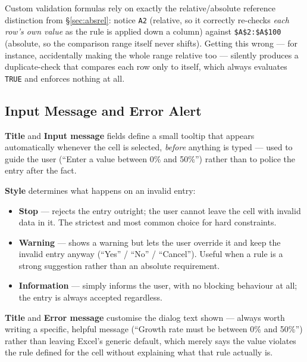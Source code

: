 \documentclass[11pt,a4paper]{article}
\begin{document}
\begin{keyconcept}
Custom validation formulas rely on exactly the relative/absolute reference distinction from \S\ref{sec:absrel}: notice \texttt{A2} (relative, so it correctly re-checks \emph{each row's own value} as the rule is applied down a column) against \texttt{\$A\$2:\$A\$100} (absolute, so the comparison range itself never shifts). Getting this wrong --- for instance, accidentally making the whole range relative too --- silently produces a duplicate-check that compares each row only to itself, which always evaluates \texttt{TRUE} and enforces nothing at all.
\end{keyconcept}

\subsection{Input Message and Error Alert}

\begin{formulasyntax}
\textbf{Title} and \textbf{Input message} fields define a small tooltip that appears automatically whenever the cell is selected, \emph{before} anything is typed --- used to guide the user (``Enter a value between 0\% and 50\%'') rather than to police the entry after the fact.
\end{formulasyntax}

\begin{formulasyntax}
\textbf{Style} determines what happens on an invalid entry:
\begin{itemize}
  \item \textbf{Stop} --- rejects the entry outright; the user cannot leave the cell with invalid data in it. The strictest and most common choice for hard constraints.
  \item \textbf{Warning} --- shows a warning but lets the user override it and keep the invalid entry anyway (``Yes'' / ``No'' / ``Cancel''). Useful when a rule is a strong suggestion rather than an absolute requirement.
  \item \textbf{Information} --- simply informs the user, with no blocking behaviour at all; the entry is always accepted regardless.
\end{itemize}
\textbf{Title} and \textbf{Error message} customise the dialog text shown --- always worth writing a specific, helpful message (``Growth rate must be between 0\% and 50\%'') rather than leaving Excel's generic default, which merely says the value violates the rule defined for the cell without explaining what that rule actually is.
\end{formulasyntax}
\end{document}
